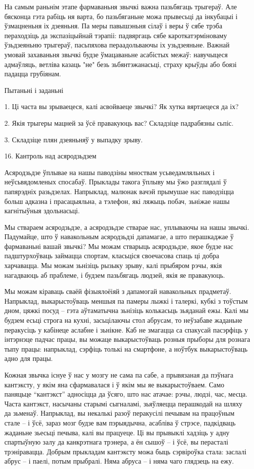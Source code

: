 На самым раньнім этапе фармаваньня звычкі важна пазьбягаць трыгераў. Але бясконца гэта рабіць ня варта, бо пазьбяганьне можа прывесьці да інкубацыі і ўзмацненьня іх дзеяньня. Па меры павышэньня сілаў і веры ў сябе трэба пераходзіць да экспазіцыйнай тэрапіі: падвяргаць сябе кароткатэрміноваму ўзьдзеяньню трыгераў, пасьпяхова пераадольваючы іх узьдзеяньне. Важнай умовай захаваньня звычкі будзе ўмацаваньне асабістых межаў: навучыцеся адмаўляць, ветліва казаць "не" безь зьбянтэжанасьці, страху крыўды або боязі падацца грубіянам.

Пытаньні і заданьні

1. Ці часта вы зрываецеся, калі асвойваеце звычкі? Як хутка вяртаецеся да іх?

2. Якія трыгеры мацней за ўсё правакуюць вас? Складзіце падрабязны сьпіс.

3. Складзіце плян дзеяньняў у выпадку зрыву.


16. Кантроль над асяродзьдзем

Асяродзьдзе ўплывае на нашы паводзіны мноствам усьведамляльных і неўсьвядомленых спосабаў. Прыклады такога ўплыву мы ўжо разглядалі ў папярэдніх разьдзелах. Напрыклад, малюнак вачэй прымушае нас паводзіцца больш адказна і прасацыяльна, а тэлефон, які ляжыць побач, зьніжае нашы кагнітыўныя здольнасьці. 

Мы ствараем асяродзьдзе, а асяродзьдзе стварае нас, уплываючы на нашы звычкі. Падумайце, што ў навакольным асяродзьдзі дапамагае, а што перашкаджае ў фармаваньні вашай звычкі? Мы можам стварыць асяродзьдзе, якое будзе нас падштурхоўваць займацца спортам, класьціся своечасова спаць ці добра харчавацца. Мы можам зьнізіць рызыку зрыву, калі прыбяром рэчы, якія нагадваюць аб праблеме, і будзем пазьбягаць людзей, якія яе правакуюць.

Мы можам кіраваць сваёй фізыялоёіяй з дапамогай навакольных прадметаў. Напрыклад, выкарыстоўваць меншыя па памеры лыжкі і талеркі, кубкі з тоўстым дном, цяжкі посуд – гэта аўтаматычна зьнізіць колькасьць зьяданай ежы. Калі мы будзем есьці строга на кухні, засьцілаючы стол абрусам, то неўзабаве жаданьне перакусіць у кабінеце аслабне і зьнікне. Каб не змагацца са спакусай пасэрфіць у інтэрнэце падчас працы, вы можаце выкарыстоўваць розныя прыборы для рознага тыпу працы: напрыклад, сэрфіць толькі на смартфоне, а ноўтбук выкарыстоўваць адно для працы.

Кожная звычка існуе ў нас у мозгу не сама па сабе, а прывязаная да пэўнага кантэксту, у якім яна сфармавалася і ў якім мы яе выкарыстоўваем. Само паняцьце “кантэкст” адносіцца да ўсяго, што нас атачае: рэчы, людзі, час, месца. Часта кантэкст, насычаны старымі сыгналамі, зьяўляецца перашкодай на шляху да зьменаў. Напрыклад, вы некалькі разоў перакусілі печывам на працоўным стале – і ўсё, зараз мозг будзе вам пэрыядычна, асабліва ў стрэсе, падкідваць жаданьне зьесьці печыва, калі вы працуеце. Ці вы прывыклі хадзіць у адну спартыўную залу да канкрэтнага трэнера, а ён сышоў – і ўсё, вы перасталі трэніравацца. Добрым прыкладам кантэксту можа быць сэрвіроўка стала: заслалі абрус – і паелі, потым прыбралі. Няма абруса – і няма чаго глядзець на ежу. 

